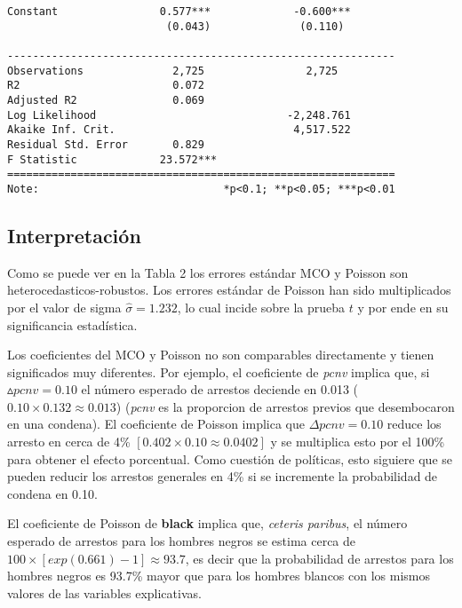 \documentclass[
  letterpaper,
  DIV=11,
  numbers=noendperiod]{scrreprt}
\begin{document}
\begin{verbatim}
Constant                0.577***             -0.600***       
                         (0.043)              (0.110)        
                                                             
-------------------------------------------------------------
Observations              2,725                2,725         
R2                        0.072                              
Adjusted R2               0.069                              
Log Likelihood                              -2,248.761       
Akaike Inf. Crit.                            4,517.522       
Residual Std. Error       0.829                              
F Statistic             23.572***                            
=============================================================
Note:                             *p<0.1; **p<0.05; ***p<0.01
\end{verbatim}

\subsection{Interpretación}\label{interpretaciuxf3n}

Como se puede ver en la Tabla 2 los errores estándar MCO y Poisson son
heterocedasticos-robustos. Los errores estándar de Poisson han sido
multiplicados por el valor de sigma \(\widehat\sigma=1.232\), lo cual
incide sobre la prueba \(t\) y por ende en su significancia estadística.

Los coeficientes del MCO y Poisson no son comparables directamente y
tienen significados muy diferentes. Por ejemplo, el coeficiente de
\emph{pcnv} implica que, si \(\vartriangle{pcnv}=0.10\) el número
esperado de arrestos deciende en 0.013 (\(0.10\times0.132\approx0.013\))
(\emph{pcnv} es la proporcion de arrestos previos que desembocaron en
una condena). El coeficiente de Poisson implica que
\(\Delta{pcnv}=0.10\) reduce los arresto en cerca de 4\%
\([0.402\times0.10\approx 0.0402]\) y se multiplica esto por el 100\%
para obtener el efecto porcentual. Como cuestión de políticas, esto
siguiere que se pueden reducir los arrestos generales en 4\% si se
incremente la probabilidad de condena en 0.10.

El coeficiente de Poisson de \textbf{black} implica que, \emph{ceteris
paribus}, el número esperado de arrestos para los hombres negros se
estima cerca de \(100\times[exp(0.661)-1]\approx93.7\), es decir que la
probabilidad de arrestos para los hombres negros es 93.7\% mayor que
para los hombres blancos con los mismos valores de las variables
explicativas.
\end{document}
